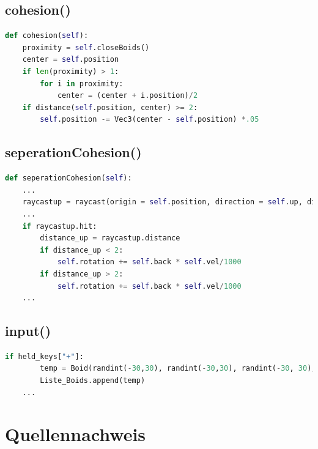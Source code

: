 \documentclass[a4paper, hidelinks, 12pt]{article}
\begin{document}
\subsection{cohesion()}\label{Codecohesion}
\begin{lstlisting}[style=mystyle, language=Python]
def cohesion(self):
	proximity = self.closeBoids()
	center = self.position
	if len(proximity) > 1:
		for i in proximity:
			center = (center + i.position)/2
	if distance(self.position, center) >= 2:
		self.position -= Vec3(center - self.position) *.05
\end{lstlisting}
\subsection{seperationCohesion()}\label{CodeseperationCohesion}
\begin{lstlisting}[style=mystyle, language=Python]
def seperationCohesion(self):
	...
	raycastup = raycast(origin = self.position, direction = self.up, distance = 5, traverse_target = scene, ignore = (Wireframe,))
	...
	if raycastup.hit:
		distance_up = raycastup.distance
		if distance_up < 2:
			self.rotation += self.back * self.vel/1000
		if distance_up > 2:
			self.rotation += self.back * self.vel/1000
	...
\end{lstlisting}
\newpage
\subsection{input()}\label{Codeinput}
\begin{lstlisting}[style=mystyle, language=Python]
	if held_keys["+"]:
		temp = Boid(randint(-30,30), randint(-30,30), randint(-30, 30), randint(0,360), randint(0,360), randint(0,360), uniform(50.0, 300.0), uniform(0.0, 10.0), 300.0, 1, groesse)
		Liste_Boids.append(temp)
	...
\end{lstlisting}
\newpage

\section{Quellennachweis}
\tiny
\newpage
\end{document}
